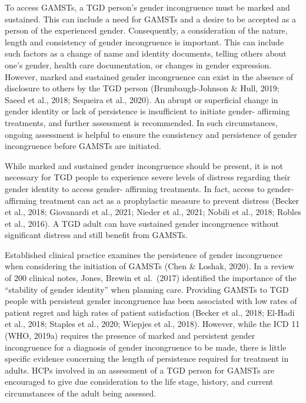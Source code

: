 \documentclass[
]{book}
\begin{document}
To access GAMSTs, a TGD person's gender
incongruence must be marked and sustained.
This can include a need for GAMSTs and a
desire to be accepted as a person of the experienced gender. Consequently, a consideration
of the nature, length and consistency of gender
incongruence is important. This can include
such factors as a change of name and identity
documents, telling others about one's gender,
health care documentation, or changes in gender
expression. However, marked and sustained gender incongruence can exist in the absence of
disclosure to others by the TGD person
(Brumbaugh-Johnson \& Hull, 2019; Saeed et al.,
2018; Sequeira et al., 2020). An abrupt or superficial change in gender identity or lack of persistence is insufficient to initiate gender- affirming
treatments, and further assessment is recommended. In such circumstances, ongoing assessment is helpful to ensure the consistency and
persistence of gender incongruence before
GAMSTs are initiated.

While marked and sustained gender incongruence should be present, it is not necessary for TGD
people to experience severe levels of distress regarding their gender identity to access gender- affirming
treatments. In fact, access to gender-affirming treatment can act as a prophylactic measure to prevent
distress (Becker et al., 2018; Giovanardi et al., 2021;
Nieder et al., 2021; Nobili et al., 2018; Robles et al.,
2016). A TGD adult can have sustained gender
incongruence without significant distress and still
benefit from GAMSTs.

Established clinical practice examines the persistence of gender incongruence when considering
the initiation of GAMSTs (Chen \& Loshak, 2020).
In a review of 200 clinical notes, Jones, Brewin
et al.~(2017) identified the importance of the
``stability of gender identity'' when planning care.
Providing GAMSTs to TGD people with persistent gender incongruence has been associated
with low rates of patient regret and high rates of
patient satisfaction (Becker et al., 2018; El-Hadi
et al., 2018; Staples et al., 2020; Wiepjes et al.,
2018). However, while the ICD 11 (WHO, 2019a)
requires the presence of marked and persistent
gender incongruence for a diagnosis of gender
incongruence to be made, there is little specific
evidence concerning the length of persistence
required for treatment in adults. HCPs involved
in an assessment of a TGD person for GAMSTs
are encouraged to give due consideration to the
life stage, history, and current circumstances of
the adult being assessed.
\end{document}
